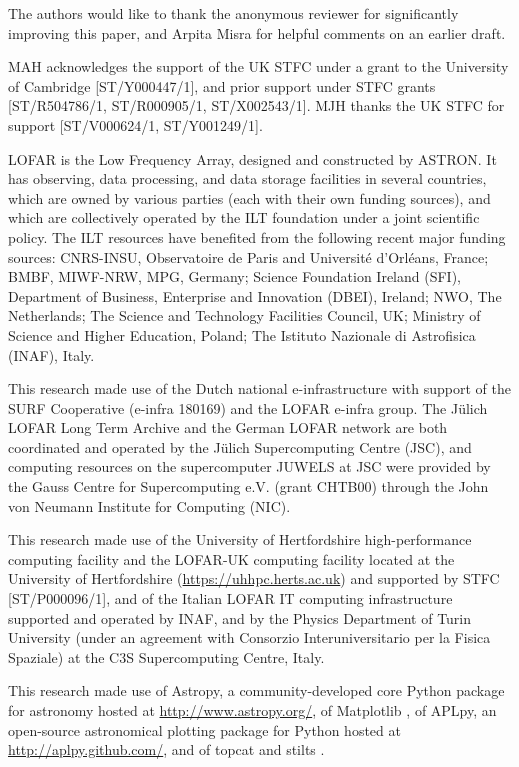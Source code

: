 \documentclass{aa}
\begin{document}
\begin{acknowledgements}
The authors would like to thank the anonymous reviewer for significantly improving this paper, and Arpita Misra for helpful comments on an earlier draft.  

MAH acknowledges the support of the UK STFC under a grant to the University of Cambridge [ST/Y000447/1], and prior support under STFC grants [ST/R504786/1, ST/R000905/1, ST/X002543/1]. MJH thanks the UK STFC for support [ST/V000624/1,  ST/Y001249/1].

LOFAR is the Low Frequency Array, designed and constructed by ASTRON. It has observing, data processing, and data storage facilities in several countries, which are owned by various parties (each with their own funding sources), and which are collectively operated by the ILT foundation under a joint scientific policy. The ILT resources have benefited from the following recent major funding sources: CNRS-INSU, Observatoire de Paris and Université d'Orléans, France; BMBF, MIWF-NRW, MPG, Germany; Science Foundation Ireland (SFI), Department of Business, Enterprise and Innovation (DBEI), Ireland; NWO, The Netherlands; The Science and Technology Facilities Council, UK; Ministry of Science and Higher Education, Poland; The Istituto Nazionale di Astrofisica (INAF), Italy.

This research made use of the Dutch national e-infrastructure with support of the SURF Cooperative (e-infra 180169) and the LOFAR e-infra group. The Jülich LOFAR Long Term Archive and the German LOFAR network are both coordinated and operated by the Jülich Supercomputing Centre (JSC), and computing resources on the supercomputer JUWELS at JSC were provided by the Gauss Centre for Supercomputing e.V. (grant CHTB00) through the John von Neumann Institute for Computing (NIC).

This research made use of the University of Hertfordshire
high-performance computing facility and the LOFAR-UK computing
facility located at the University of Hertfordshire (\url{https://uhhpc.herts.ac.uk}) and supported by
STFC [ST/P000096/1], and of the Italian LOFAR IT computing
infrastructure supported and operated by INAF, and by the Physics
Department of Turin University (under an agreement with Consorzio
Interuniversitario per la Fisica Spaziale) at the C3S Supercomputing
Centre, Italy.

This research made use of {\sc Astropy}, a
community-developed core Python package for astronomy
\citep{AstropyCollaboration13} hosted at
\url{http://www.astropy.org/}, of {\sc Matplotlib} \citep{Hunter07},
of {\sc APLpy}, an open-source astronomical plotting package for
Python hosted at \url{http://aplpy.github.com/}, and of {\sc topcat}
and {\sc stilts} \citep{Taylor05}.
\end{acknowledgements}
  

\renewcommand{\refname}{REFERENCES}

\clearpage
\end{document}
